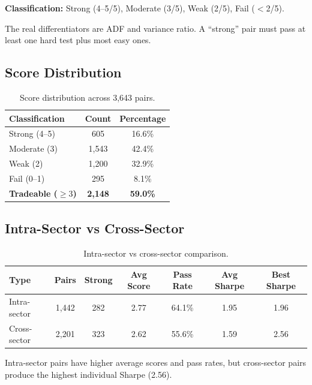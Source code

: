\documentclass[11pt, a4paper]{article}
\begin{document}
\textbf{Classification:} Strong (4--5/5), Moderate (3/5), Weak (2/5), Fail ($<$2/5).

The real differentiators are ADF and variance ratio. A ``strong'' pair must pass at least one hard test plus most easy ones.

\subsection{Score Distribution}

\begin{table}[H]
\centering
\caption{Score distribution across 3,643 pairs.}
\begin{tabular}{@{}lcc@{}}
\toprule
\textbf{Classification} & \textbf{Count} & \textbf{Percentage} \\
\midrule
Strong (4--5)  & 605   & 16.6\% \\
Moderate (3)   & 1,543 & 42.4\% \\
Weak (2)       & 1,200 & 32.9\% \\
Fail (0--1)    & 295   & 8.1\%  \\
\midrule
\textbf{Tradeable ($\geq 3$)} & \textbf{2,148} & \textbf{59.0\%} \\
\bottomrule
\end{tabular}
\label{tab:score-dist}
\end{table}

\subsection{Intra-Sector vs Cross-Sector}

\begin{table}[H]
\centering
\caption{Intra-sector vs cross-sector comparison.}
\begin{tabular}{@{}lcccccc@{}}
\toprule
\textbf{Type} & \textbf{Pairs} & \textbf{Strong} & \textbf{Avg Score} & \textbf{Pass Rate} & \textbf{Avg Sharpe} & \textbf{Best Sharpe} \\
\midrule
Intra-sector   & 1,442 & 282 & 2.77 & 64.1\% & 1.95 & 1.96 \\
Cross-sector   & 2,201 & 323 & 2.62 & 55.6\% & 1.59 & 2.56 \\
\bottomrule
\end{tabular}
\label{tab:intra-cross}
\end{table}

Intra-sector pairs have higher average scores and pass rates, but cross-sector pairs produce the highest individual Sharpe (2.56).
\end{document}
